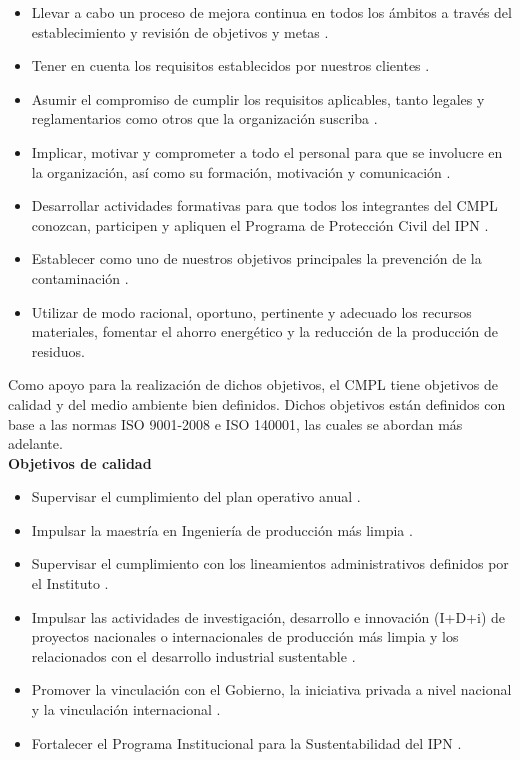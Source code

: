 	\begin{itemize}
		\item Llevar a cabo un proceso de mejora continua en todos los ámbitos a través del establecimiento y revisión de objetivos y metas \cite{PoliticaCMPL}.
		\item Tener en cuenta los requisitos establecidos por nuestros clientes \cite{PoliticaCMPL}.
		\item Asumir el compromiso de cumplir los requisitos aplicables, tanto legales y reglamentarios como otros que la organización suscriba \cite{PoliticaCMPL}.
		\item Implicar, motivar y comprometer a todo el personal para que se involucre en la organización, así como su formación, motivación y comunicación \cite{PoliticaCMPL}.
		\item Desarrollar actividades formativas para que todos los integrantes del CMPL conozcan, participen y apliquen el Programa de Protección Civil del IPN \cite{PoliticaCMPL}.
		\item Establecer como uno de nuestros objetivos principales la prevención de la contaminación \cite{PoliticaCMPL}.
		\item Utilizar de modo racional, oportuno, pertinente y adecuado los recursos materiales, fomentar el ahorro energético y la reducción de la producción de residuos\cite{PoliticaCMPL}. 
	\end{itemize}

	Como apoyo para la realización de dichos objetivos, el CMPL tiene objetivos de calidad y del medio ambiente bien definidos. Dichos objetivos están definidos con base a las normas ISO 9001-2008 e ISO 140001, las cuales se abordan más adelante.\\

\textbf{Objetivos de calidad}

\begin{itemize}
	\item Supervisar el cumplimiento del plan operativo anual \cite{PoliticaCMPL}.
	\item Impulsar la maestría en Ingeniería de producción más limpia \cite{PoliticaCMPL}.
	\item Supervisar el cumplimiento con los lineamientos administrativos definidos por el Instituto \cite{PoliticaCMPL}.
	\item Impulsar las actividades de investigación, desarrollo e innovación (I+D+i) de proyectos nacionales o internacionales de producción más limpia y los relacionados con el desarrollo industrial sustentable \cite{PoliticaCMPL}.
 \item Promover la vinculación con el Gobierno, la iniciativa privada a nivel nacional y la vinculación internacional \cite{PoliticaCMPL}.
	\item Fortalecer el Programa Institucional para la Sustentabilidad del IPN \cite{PoliticaCMPL}.
\end{itemize}

